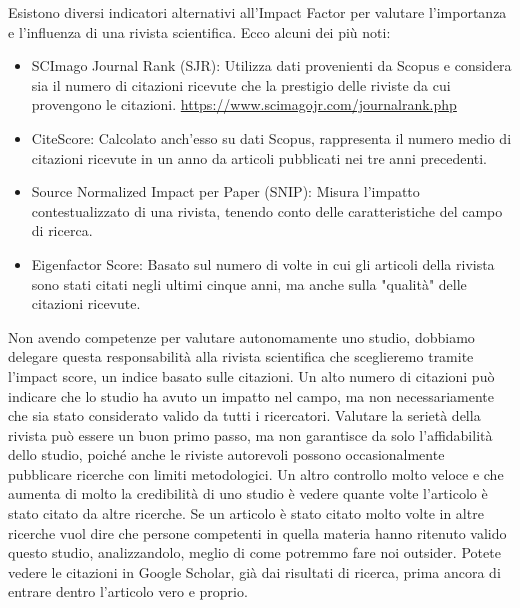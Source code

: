 \documentclass[12pt]{book} %
\begin{document}
Esistono diversi indicatori alternativi all'Impact Factor per valutare l'importanza e l'influenza di una rivista
scientifica. Ecco alcuni dei più noti:

\begin{itemize}
\item SCImago Journal Rank (SJR): Utilizza dati provenienti da Scopus e considera sia il numero di citazioni ricevute
che la prestigio delle riviste da cui provengono le citazioni. \url{https://www.scimagojr.com/journalrank.php} 
\item CiteScore: Calcolato anch'esso su dati Scopus, rappresenta il numero medio di citazioni ricevute in un anno da
articoli pubblicati nei tre anni precedenti.
\item Source Normalized Impact per Paper (SNIP): Misura l'impatto contestualizzato di una rivista, tenendo conto delle
caratteristiche del campo di ricerca.
\item Eigenfactor Score: Basato sul numero di volte in cui gli articoli della rivista sono stati citati negli ultimi
cinque anni, ma anche sulla "qualità" delle citazioni ricevute.
\end{itemize}

Non avendo competenze per valutare autonomamente uno studio, dobbiamo delegare questa responsabilità alla rivista
scientifica che sceglieremo tramite l'impact score, un indice basato sulle citazioni. Un alto numero di citazioni può indicare che lo studio ha avuto un impatto nel campo, ma non necessariamente che sia stato considerato valido da tutti i ricercatori. Valutare la serietà della rivista può essere un buon primo passo, ma non garantisce da solo l’affidabilità dello studio, poiché anche le riviste autorevoli possono occasionalmente pubblicare ricerche con limiti metodologici. Un altro controllo molto veloce e che aumenta di molto la credibilità di uno
studio è vedere quante volte l'articolo è stato citato da altre ricerche. Se un articolo è stato
citato molto volte in altre ricerche vuol dire che persone competenti in quella materia hanno ritenuto valido questo
studio, analizzandolo, meglio di come potremmo fare noi outsider. Potete vedere le citazioni in Google Scholar, già dai
risultati di ricerca, prima ancora di entrare dentro l'articolo vero e proprio.
\end{document}
